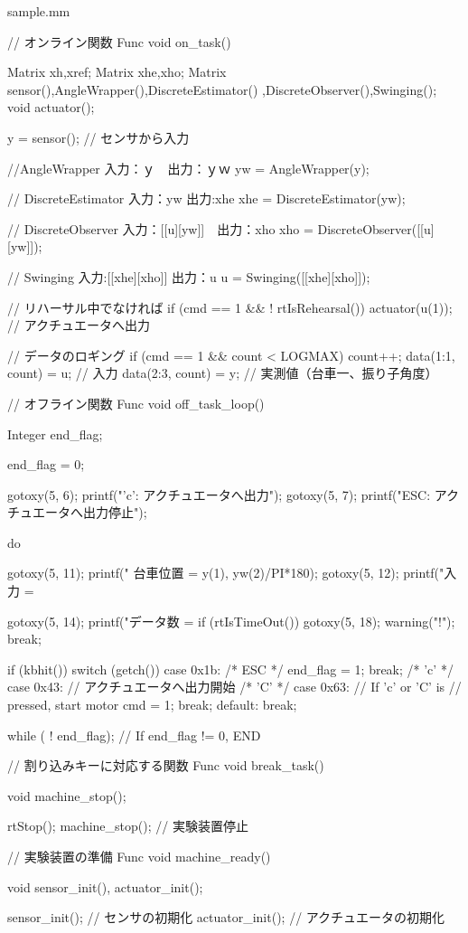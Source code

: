 \begin{breakitembox}[l]{sample.mm}
\begin{verbatimtab}[4]
// オンライン関数
Func void on_task()
{
	Matrix xh,xref;
	Matrix xhe,xho;
	Matrix sensor(),AngleWrapper(),DiscreteEstimator()
						,DiscreteObserver(),Swinging();
	void actuator();

	y = sensor();				// センサから入力

	//AngleWrapper 入力：ｙ　出力：ｙｗ
    	yw = AngleWrapper(y);

	// DiscreteEstimator 入力：yw 出力:xhe
	xhe = DiscreteEstimator(yw);

	// DiscreteObserver 入力：[[u][yw]]　出力：xho
	xho = DiscreteObserver([[u][yw]]);

	// Swinging 入力:[[xhe][xho]] 出力：u
	u = Swinging([[xhe][xho]]);

	// リハーサル中でなければ
	if (cmd == 1 && ! rtIsRehearsal()) {
		actuator(u(1));	 		// アクチュエータへ出力
	}

	// データのロギング
	if (cmd == 1 && count < LOGMAX) {
		count++;
		data(1:1, count) = u; // 入力
		data(2:3, count) = y; // 実測値（台車一、振り子角度）
	}
}

// オフライン関数
Func void off_task_loop()
{
	Integer end_flag;

	end_flag = 0;

	gotoxy(5, 6);
	printf("'c': アクチュエータへ出力");
	gotoxy(5, 7);
	printf("ESC: アクチュエータへ出力停止");

	do {
		gotoxy(5, 11);
		printf("  台車位置 = %
			y(1), yw(2)/PI*180);
		gotoxy(5, 12);
		printf("入力 = %

		gotoxy(5, 14);
		printf("データ数 = %
		if (rtIsTimeOut()) {
			gotoxy(5, 18);
			warning(" !\n");
			break;
		}

		if (kbhit()) {
			switch (getch()) {
			  case 0x1b:            /* ESC */
				end_flag = 1;
				break;
		/* 'c' */  case 0x43: // アクチュエータへ出力開始
		/* 'C' */  case 0x63: // If 'c' or 'C' is 
				      // pressed, start motor
				cmd = 1;
				break;
			  default:
				break;
			}
		}
    } while ( ! end_flag);  // If end_flag != 0, END
}

// 割り込みキーに対応する関数
Func void break_task()
{
	void machine_stop();

	rtStop();
	machine_stop(); // 実験装置停止
}

// 実験装置の準備
Func void machine_ready()
{
	void sensor_init(), actuator_init();

	sensor_init();                  // センサの初期化
	actuator_init();                // アクチュエータの初期化

}
\end{verbatimtab}
\end{breakitembox}
